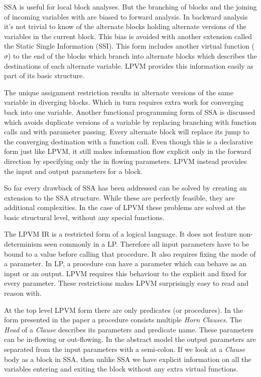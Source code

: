 SSA is useful for local block analyses. But the branching of blocks and the
joining of incoming variables with \phifs are biased to forward analysis. In
backward analysis it's not trivial to know of the alternate blocks holding
alternate versions of the variables in the current block. This bias is avoided
with another extension called the Static Single Information (SSI). This form
includes another virtual function ($\sigma$) to the end of the blocks which
branch into alternate blocks which describes the destinations of each alternate
variable. LPVM provides this information easily as part of its basic structure.

The unique assignment restriction results in alternate versions of the same
variable in diverging blocks. Which in turn requires extra work for converging
back into one variable. Another functional programming form of SSA
\citep{appelfp} is discussed which avoids duplicate versions of a variable by
replacing branching with function calls and \phifs with parameter
passing. Every alternate block will replace its jump to the converging
destination with a function call. Even though this is a declarative form just
like LPVM, it still makes information flow explicit only in the forward
direction by specifying only the in flowing parameters. LPVM instead provides
the input and output parameters for a block.

So far every drawback of SSA has been addressed can be solved by creating an
extension to the SSA structure. While these are perfectly feasible, they are
additional complexities. In the case of LPVM these problems are solved at the
basic structural level, without any special functions.

The LPVM IR is a restricted form of a logical language. It does not feature
non-determinism seen commonly in a LP. Therefore all input parameters have to
be bound to a value before calling that procedure. It also requires fixing the
mode of a parameter. In LP, a procedure can have a parameter which can behave
as an input or an output. LPVM requires this behaviour to the explicit and
fixed for every parameter. These restrictions makes LPVM surprisingly easy to
read and reason with.


At the top level LPVM form there are only predicates (or procedures). In the
form presented in the paper a procedure consists multiple \textit{Horn
  Clauses}. The \textit{Head} of a \textit{Clause} describes its parameters and
predicate name. These parameters can be in-flowing or out-flowing. In the
abstract model the output parameters are separated from the input parameters
with a semi-colon. If we look at a \textit{Clause} body as a block in SSA,
then unlike SSA we have explicit information on all the variables entering and
exiting the block without any extra virtual functions.

